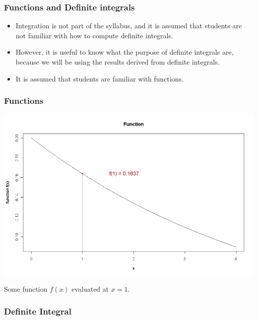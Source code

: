 \frametitle{Functions and Definite integrals}
\begin{itemize}
\item Integration is not part of the syllabus, and it is assumed that students are not familiar with how to compute definite integrals.
\item However,  it is useful to know what the purpose of definite integrals are, because we will be using the results derived from definite integrals. \item It is assumed that students are familiar with functions.
\end{itemize}
\smallskip 

\frametitle{Functions}

\vspace{-0.5cm}

\begin{center}
\includegraphics[scale=0.30]{6AFunction}

\end{center}

Some function $f(x)$ evaluated at $x=1$.
\smallskip 

\frametitle{Definite Integral}

